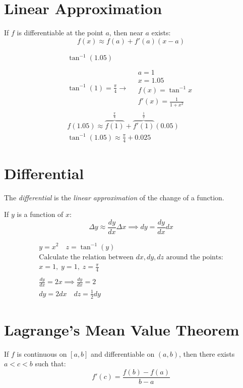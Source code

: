 \documentclass[00_complete]{subfiles}
\begin{document}
\section{Linear Approximation}

\begin{reminder}
    If $f$ is differentiable at the point $a$, then near $a$ exists:
    $$f(x) \approx f(a)+f'(a)(x-a)$$
\end{reminder}

\begin{example}
    $$
    \begin{gathered}
        \tan^{-1}(1.05) \\ \\
        \tan^{-1}(1) = \frac{\pi}{4} \to \quad \begin{gathered}
            a = 1 \\ x = 1.05 \\ f(x) = \tan^{-1}x \\ f'(x) = \frac{1}{1+x^2}
        \end{gathered} \\
        f(1.05) \approx \overbrace{f(1)}^{\frac{\pi}{4}} +
        \overbrace{f'(1)}^{\frac{1}{2}}(0.05) \\
        \tan^{-1}(1.05) \approx \frac{\pi}{4} + 0.025
    \end{gathered}
    $$
\end{example}

\section{Differential}

\begin{definition}
    The \emph{differential} is the \emph{linear approximation} of the change of
    a function.
\end{definition}

If $y$ is a function of $x$:
\[
    \Delta y \approx \frac{dy}{dx} \Delta x \implies
    dy = \frac{dy}{dx}dx
\]

\begin{example}
    $$
    \begin{gathered}
        y = x^2 \quad z = \tan^{-1}(y) \\
        \text{Calculate the relation between $dx, dy, dz$ around the points:}
        \\
        x=1,\;y=1,\;z=\frac{\pi}{4} \\ \\
        \frac{dy}{dx} =2x \implies \frac{dy}{dx} = 2 \\
        dy = 2dx \quad dz = \frac{1}{2}dy
    \end{gathered}
    $$
\end{example}

\section{Lagrange's Mean Value Theorem}

\begin{definition}
    If $f$ is continuous on $[a,b]$ and differentiable on $(a,b)$, then there
    exists $a<c<b$ such that:
    \[
        f'(c) = \frac{f(b)-f(a)}{b-a}
    \]
\end{definition}
\end{document}
